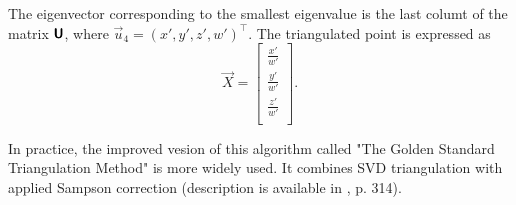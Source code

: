 The eigenvector corresponding to the smallest eigenvalue is the last columt of the matrix $\pmb{\mathsf{U}}$, where $\vec{u}_4 = (x', y', z', w')^\top$.
The triangulated point is expressed as
\begin{equation}
    \vec{X} = \begin{bmatrix}
        \frac{x'}{w'} \\
        \frac{y'}{w'} \\
        \frac{z'}{w'} \\
    \end{bmatrix}.
\end{equation}

In practice, the improved vesion of this algorithm called "The Golden Standard Triangulation Method" is more widely used.
It combines SVD triangulation with applied Sampson correction (description is available in \cite{hartley_zisserman_2004}, p. 314). 
